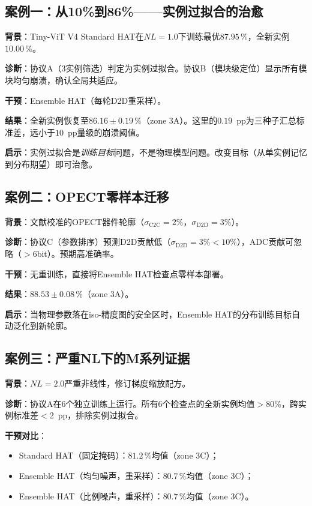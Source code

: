 \subsection{案例一：从10\%到86\%——实例过拟合的治愈}
\label{subsec:case_instance_overfitting}

\textbf{背景}：Tiny-ViT V4 Standard HAT在$NL=1.0$下训练最优$87.95\,\%$，全新实例$10.00\,\%$。

\textbf{诊断}：协议A（3实例筛选）判定为实例过拟合。协议B（模块级定位）显示所有模块均匀崩溃，确认全局共适应。

\textbf{干预}：Ensemble HAT（每轮D2D重采样）。

\textbf{结果}：全新实例恢复至$86.16\pm0.19\,\%$（zone 3A）。这里的$0.19$~pp为三种子汇总标准差，远小于$10$~pp量级的崩溃阈值。

\textbf{启示}：实例过拟合是\emph{训练目标}问题，不是物理模型问题。改变目标（从单实例记忆到分布期望）即可治愈。

\subsection{案例二：OPECT零样本迁移}
\label{subsec:case_opect}

\textbf{背景}：文献校准的OPECT器件轮廓（$\sigma_{\mathrm{C2C}}=2\%$，$\sigma_{\mathrm{D2D}}=3\%$）。

\textbf{诊断}：协议C（参数排序）预测D2D贡献低（$\sigma_{\mathrm{D2D}}=3\%<10\%$），ADC贡献可忽略（$>$6bit）。预期高准确率。

\textbf{干预}：无重训练，直接将Ensemble HAT检查点零样本部署。

\textbf{结果}：$88.53\pm0.08\,\%$（zone 3A）。

\textbf{启示}：当物理参数落在iso-精度图的安全区时，Ensemble HAT的分布训练目标自动泛化到新轮廓。

\subsection{案例三：严重NL下的M系列证据}
\label{subsec:case_m_series}

\textbf{背景}：$NL=2.0$严重非线性，修订梯度缩放配方。

\textbf{诊断}：协议A在6个独立训练上运行。所有6个检查点的全新实例均值$>$80\%，跨实例标准差$<$2~pp，排除实例过拟合。

\textbf{干预对比}：
\begin{itemize}
    \item Standard HAT（固定掩码）：$81.2\,\%$均值（zone 3C）；
    \item Ensemble HAT（均匀噪声，重采样）：$80.7\,\%$均值（zone 3C）；
    \item Ensemble HAT（比例噪声，重采样）：$80.7\,\%$均值（zone 3C）。
\end{itemize}

